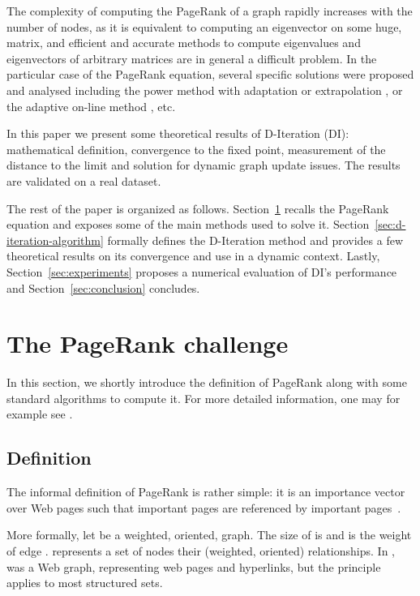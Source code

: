 \documentclass{llncs}
\begin{document}
The complexity of computing the PageRank of a graph rapidly increases with the number of nodes, as it is equivalent to computing an eigenvector on some huge, matrix, and efficient and accurate methods to compute eigenvalues and eigenvectors of arbitrary matrices are in general a difficult problem. In the particular case of the PageRank equation, several specific solutions were proposed and analysed \cite{LM04,BM05} including the power method \cite{BP99} with adaptation \cite{ST03} or extrapolation \cite{TS03,CG03}, or the adaptive on-line method \cite{AP03}, etc.

In this paper we present some theoretical results of D-Iteration (DI): mathematical definition, convergence to the fixed point, measurement of the distance to the limit and solution for dynamic graph update issues. The results are validated on a real dataset.




The rest of the paper is organized as follows. Section~\ref{sec:the-pagerank-challenge} recalls the PageRank equation and exposes some of the main methods used to solve it. Section~\ref{sec:d-iteration-algorithm} formally defines the D-Iteration method and provides a few theoretical results on its convergence and use in a dynamic context.
Lastly, Section~\ref{sec:experiments} proposes a numerical evaluation of DI's performance and Section~\ref{sec:conclusion} concludes.


\section{The PageRank challenge}\label{sec:the-pagerank-challenge}


In this section, we shortly introduce the definition of PageRank along with some standard algorithms to compute it. For more detailed information, one may for example see \cite{LM04}.

\subsection{Definition}

The informal definition of PageRank is rather simple: it is an importance vector over Web pages such that important pages are referenced by important pages~\cite{BP98}.


More formally, let  be a weighted, oriented, graph. The size of  is  and  is the weight of edge .
 represents a set of nodes their (weighted, oriented) relationships. In \cite{BP98},  was a Web graph,  representing web pages and  hyperlinks, but the principle applies to most structured sets.
\end{document}
